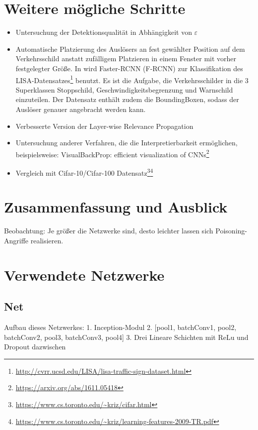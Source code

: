 \documentclass[11pt,a4paper]{article}
\numberwithin{equation}{section}
\begin{document}
	\section{Weitere mögliche Schritte} \label{chapter_weitereSchritte}
	\begin{itemize}
		\item Untersuchung der Detektionsqualität in Abhängigkeit von $\varepsilon$
		\item Automatische Platzierung des Auslösers an fest gewählter Position auf dem Verkehrsschild anstatt zufälligem Platzieren in einem Fenster mit vorher festgelegter Größe. In \cite{badnets} wird  Faster-RCNN (F-RCNN) zur Klassifikation des LISA-Datensatzes\footnote{\url{http://cvrr.ucsd.edu/LISA/lisa-traffic-sign-dataset.html}} benutzt. Es ist die Aufgabe, die Verkehrsschilder in die 3 Superklassen Stoppschild, Geschwindigkeitsbegrenzung und Warnschild einzuteilen. Der Datensatz enthält zudem die BoundingBoxen, sodass der Auslöser genauer angebracht werden kann.
		\item Verbesserte Version der Layer-wise Relevance Propagation
		\item Untersuchung anderer Verfahren, die die Interpretierbarkeit ermöglichen, beispielsweise: VisualBackProp: efficient visualization of CNNs\footnote{\url{https://arxiv.org/abs/1611.05418}}
		\item Vergleich mit Cifar-10/Cifar-100 Datensatz\footnote{\url{https://www.cs.toronto.edu/~kriz/cifar.html}}\footnote{\url{https://www.cs.toronto.edu/~kriz/learning-features-2009-TR.pdf}}
	\end{itemize}
	
	
	\section{Zusammenfassung und Ausblick} \label{chapter_conclusion}
	Beobachtung: Je größer die Netzwerke sind, desto leichter lassen sich Poisoning-Angriffe realisieren.
	
	\printglossaries
	\newpage
	\appendix
	\section{Verwendete Netzwerke}
	\subsection{Net}
	

	Aufbau dieses Netzwerkes:
	1. Inception-Modul
	2. [pool1, batchConv1, pool2, batchConv2, pool3, batchConv3, pool4]
	3. Drei Lineare Schichten mit ReLu und Dropout dazwischen
	
\end{document}
